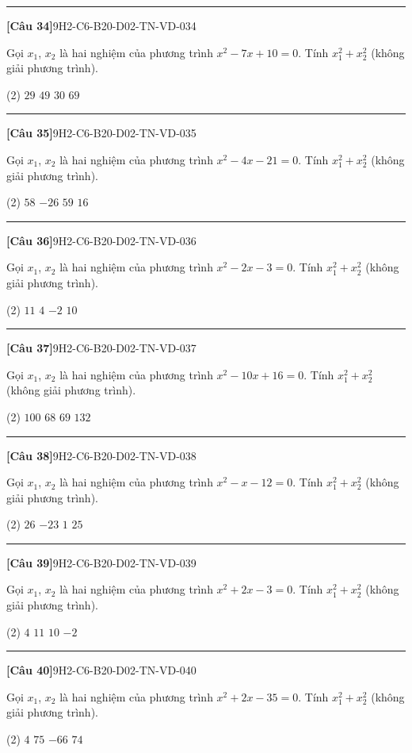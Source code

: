 \documentclass[12pt,a4paper]{article}
\newif\ifloigiai
\newenvironment{cauhoi}[2]{%
  \par\medskip\noindent\rule{\textwidth}{0.4pt}\par\nopagebreak
  \noindent\textbf{[#1]}\hfill{\scriptsize\ttfamily #2}\par\nopagebreak\smallskip}{\par}
\newcommand{\dapan}[1]{\ifloigiai\par\smallskip\noindent\textit{Đáp án:} \textbf{#1}\par\fi}
\begin{document}
\begin{cauhoi}{Câu 34}{9H2-C6-B20-D02-TN-VD-034}
Gọi $x_1$, $x_2$ là hai nghiệm của phương trình $x^{2}-7x+10=0$. Tính $x_1^{2}+x_2^{2}$ (không giải phương trình).
\begin{tasks}(2)
\task $29$
\task $49$
\task $30$
\task $69$
\end{tasks}
\dapan{A}
\end{cauhoi}
\begin{cauhoi}{Câu 35}{9H2-C6-B20-D02-TN-VD-035}
Gọi $x_1$, $x_2$ là hai nghiệm của phương trình $x^{2}-4x-21=0$. Tính $x_1^{2}+x_2^{2}$ (không giải phương trình).
\begin{tasks}(2)
\task $58$
\task $-26$
\task $59$
\task $16$
\end{tasks}
\dapan{A}
\end{cauhoi}
\begin{cauhoi}{Câu 36}{9H2-C6-B20-D02-TN-VD-036}
Gọi $x_1$, $x_2$ là hai nghiệm của phương trình $x^{2}-2x-3=0$. Tính $x_1^{2}+x_2^{2}$ (không giải phương trình).
\begin{tasks}(2)
\task $11$
\task $4$
\task $-2$
\task $10$
\end{tasks}
\dapan{D}
\end{cauhoi}
\begin{cauhoi}{Câu 37}{9H2-C6-B20-D02-TN-VD-037}
Gọi $x_1$, $x_2$ là hai nghiệm của phương trình $x^{2}-10x+16=0$. Tính $x_1^{2}+x_2^{2}$ (không giải phương trình).
\begin{tasks}(2)
\task $100$
\task $68$
\task $69$
\task $132$
\end{tasks}
\dapan{B}
\end{cauhoi}
\begin{cauhoi}{Câu 38}{9H2-C6-B20-D02-TN-VD-038}
Gọi $x_1$, $x_2$ là hai nghiệm của phương trình $x^{2}-x-12=0$. Tính $x_1^{2}+x_2^{2}$ (không giải phương trình).
\begin{tasks}(2)
\task $26$
\task $-23$
\task $1$
\task $25$
\end{tasks}
\dapan{D}
\end{cauhoi}
\begin{cauhoi}{Câu 39}{9H2-C6-B20-D02-TN-VD-039}
Gọi $x_1$, $x_2$ là hai nghiệm của phương trình $x^{2}+2x-3=0$. Tính $x_1^{2}+x_2^{2}$ (không giải phương trình).
\begin{tasks}(2)
\task $4$
\task $11$
\task $10$
\task $-2$
\end{tasks}
\dapan{C}
\end{cauhoi}
\begin{cauhoi}{Câu 40}{9H2-C6-B20-D02-TN-VD-040}
Gọi $x_1$, $x_2$ là hai nghiệm của phương trình $x^{2}+2x-35=0$. Tính $x_1^{2}+x_2^{2}$ (không giải phương trình).
\begin{tasks}(2)
\task $4$
\task $75$
\task $-66$
\task $74$
\end{tasks}
\dapan{D}
\end{cauhoi}
\end{document}
